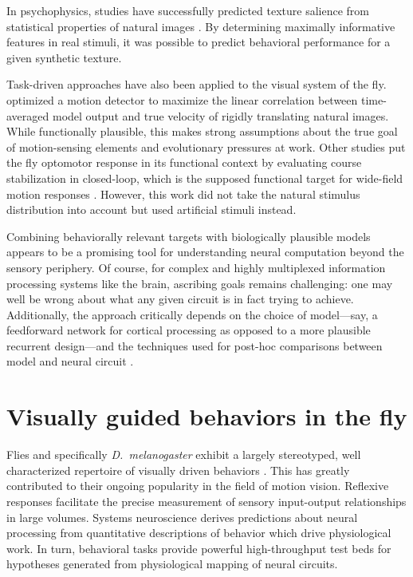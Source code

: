 In psychophysics, studies have successfully predicted texture salience from statistical properties of natural images \citep{Tkacik:2010aa,Hermundstad:2014aa}. By determining maximally informative features in real stimuli, it was possible to predict behavioral performance for a given synthetic texture.

Task-driven approaches have also been applied to the visual system of the fly. \citet{Clark:2014aa} optimized a motion detector to maximize the linear correlation between time-averaged model output and true velocity of rigidly translating natural images. While functionally plausible, this makes strong assumptions about the true goal of motion-sensing elements and evolutionary pressures at work. Other studies put the fly optomotor response in its functional context by evaluating course stabilization in closed-loop, which is the supposed functional target for wide-field motion responses \citep{Warzecha:1996bm,Warzecha:1998tn}. However, this work did not take the natural stimulus distribution into account but used artificial stimuli instead.

Combining behaviorally relevant targets with biologically plausible models appears to be a promising tool for understanding neural computation beyond the sensory periphery. Of course, for complex and highly multiplexed information processing systems like the brain, ascribing goals remains challenging: one may well be wrong about what any given circuit is in fact trying to achieve. Additionally, the approach critically depends on the choice of model---say, a feedforward network for cortical processing as opposed to a more plausible recurrent design---and the techniques used for post-hoc comparisons between model and neural circuit \citep{Yamins:2016hg}.


\section{Visually guided behaviors in the fly}
Flies and specifically \textit{D.\ melanogaster} exhibit a largely stereotyped, well characterized repertoire of visually driven behaviors \citep{Borst:2014kl}. This has greatly contributed to their ongoing popularity in the field of motion vision. Reflexive responses facilitate the precise measurement of sensory input-output relationships in large volumes. Systems neuroscience derives predictions about neural processing from quantitative descriptions of behavior which drive physiological work. In turn, behavioral tasks provide powerful high-throughput test beds for hypotheses generated from physiological mapping of neural circuits.

